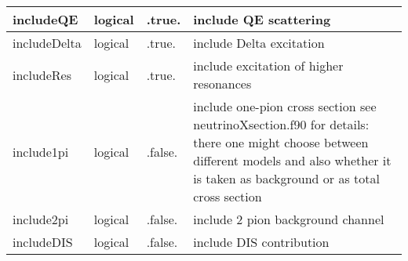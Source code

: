 \documentclass{article}
\begin{document}
\begin{longtable}{llll}
\midrule
includeQE & \begin{minipage}[t]{2cm}logical\end{minipage} & \begin{minipage}[t]{2cm}.true.\end{minipage} & \begin{minipage}[t]{12cm}include QE scattering\end{minipage}\\*
\midrule
includeDelta & \begin{minipage}[t]{2cm}logical\end{minipage} & \begin{minipage}[t]{2cm}.true.\end{minipage} & \begin{minipage}[t]{12cm}include Delta excitation\end{minipage}\\*
\midrule
includeRes & \begin{minipage}[t]{2cm}logical\end{minipage} & \begin{minipage}[t]{2cm}.true.\end{minipage} & \begin{minipage}[t]{12cm}include excitation of higher resonances\end{minipage}\\*
\midrule
include1pi & \begin{minipage}[t]{2cm}logical\end{minipage} & \begin{minipage}[t]{2cm}.false.\end{minipage} & \begin{minipage}[t]{12cm}include one-pion cross section see neutrinoXsection.f90 for details: there one might choose between different models and also whether it is taken as background or as total cross section\end{minipage}\\*
\midrule
include2pi & \begin{minipage}[t]{2cm}logical\end{minipage} & \begin{minipage}[t]{2cm}.false.\end{minipage} & \begin{minipage}[t]{12cm}include 2 pion background channel\end{minipage}\\*
\midrule
includeDIS & \begin{minipage}[t]{2cm}logical\end{minipage} & \begin{minipage}[t]{2cm}.false.\end{minipage} & \begin{minipage}[t]{12cm}include DIS contribution\end{minipage}\\*

\end{longtable}
\end{document}
